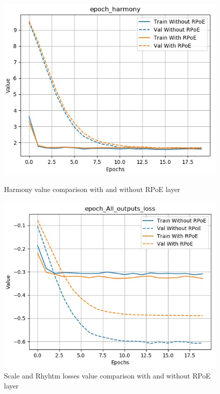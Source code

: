 \documentclass[12pt]{report}
\begin{document}
\begin{figure}[htbp]
    \begin{minipage}{0.5\textwidth}
        \begin{center}
            \includegraphics[width=\textwidth]{images/experiences/rpoe-rnn/harmony-comparison-rpoe.jpg}
            \caption{Harmony value comparison with and without RPoE layer}
            \label{fig:harmony-comparison-rpoe}
        \end{center}
    \end{minipage} \hfill
    \begin{minipage}{0.5 \textwidth}
        \begin{center}
            \includegraphics[width=\textwidth]{images/experiences/rpoe-rnn/all-output-comparison-rpoe.jpg}
            \caption{Scale and Rhyhtm losses value comparison with and without RPoE layer}
            \label{fig:all-output-comparison-rpoe}
        \end{center}
    \end{minipage}
\end{figure}
\end{document}

